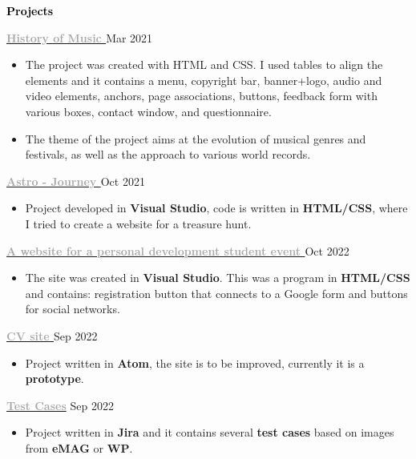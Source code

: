 \documentclass[11pt, a4paper]{article}
\newcommand{\newsection}[2]{\Large\textbf{\textcolor{#2}{#1}} \hrulefill\normalsize} %
\newcommand{\newsubsection}[4]{\normalsize\textbf{\textcolor{#3}{#1}} \hfill\small\textcolor{#4}{#2}\normalsize} %
\newcommand{\customitem}{\vspace{-1.5mm}\item}
\newenvironment{cvsection}[2] %
{
    \newsection{#1}{#2}
    \vspace{1mm}
    \small
    
}
{
    \vspace{1mm}
}
\newenvironment{newentry}[5] %
{
    \newsubsection{#1}{#2}{#3}{#4}
    \small
    
    \textcolor{#4}{#5}
    \begin{itemize}
        \small
}
{
    \end{itemize}
}
\begin{document}
    {\vspace{-1mm}}
\begin{cvsection}{Projects}{black}

    \begin{newentry}{\href{https://github.com/Andrei4226/Istoria-muzicii}{\textcolor{darkgray}{ History of Music \faExternalLink}}}{Mar 2021}{darkgray}{mediumgray}{\vspace{-3mm}}
        \customitem The project was created with HTML and CSS. I used tables to align the elements and it contains a menu, copyright bar, banner+logo, audio and video elements, anchors, page associations, buttons, feedback form with various boxes, contact window, and questionnaire.
        \customitem The theme of the project aims at the evolution of musical genres and festivals, as well as the approach to various world records.
    \end{newentry}

    \begin{newentry}{\href{https://github.com/Andrei4226/Treasure-Hunt}{\textcolor{darkgray}{ Astro - Journey \faExternalLink}}}{Oct 2021}{darkgray}{mediumgray}{\vspace{-3mm}}
        \customitem Project developed in \textbf{Visual Studio}, code is written in \textbf{HTML/CSS}, where I tried to create a website for a treasure hunt.
    \end{newentry}

    \begin{newentry}{\href{https://github.com/Andrei4226/Crystal-Clear}{\textcolor{darkgray}{A website for a personal development student event \faExternalLink}}}{Oct 2022}{darkgray}{mediumgray}{\vspace{-3mm}}
        \customitem The site was created in \textbf{Visual Studio}. This was a program in \textbf{HTML/CSS} and contains: registration button that connects to a Google form and buttons for social networks.
    \end{newentry}

    \begin{newentry}{\href{https://github.com/Andrei4226/CV}{\textcolor{darkgray}{CV site \faExternalLink}}}{Sep 2022}{darkgray}{mediumgray}{\vspace{-3mm}}
        \customitem Project written in \textbf{Atom}, the site is to be improved, currently it is a \textbf{prototype}.
    \end{newentry}
    
    \begin{newentry}{\href{https://github.com/Andrei4226/Test-Cases}{\textcolor{darkgray}{Test Cases\faExternalLink}}}{Sep 2022}{darkgray}{mediumgray}{\vspace{-3mm}}
        \customitem Project written in \textbf{Jira} and it contains several \textbf{test cases} based on images from \textbf{eMAG} or \textbf{WP}.
    \end{newentry}
    

\end{cvsection}
\end{document}
